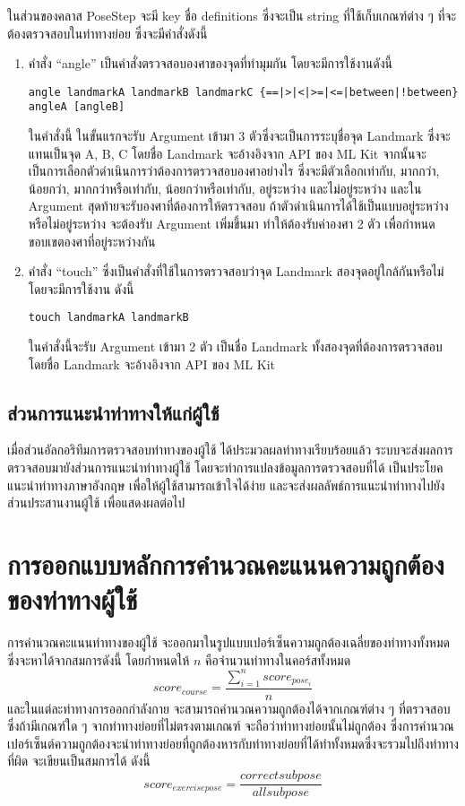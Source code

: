 ในส่วนของคลาส PoseStep จะมี key ชื่อ definitions ซึ่งจะเป็น string ที่ใช้เก็บเกณฑ์ต่าง ๆ ที่จะต้องตรวจสอบในท่าทางย่อย ซึ่งจะมีคำสั่งดังนี้

\begin{enumerate}
    \item คำสั่ง “angle” เป็นคำสั่งตรวจสอบองศาของจุดที่ทำมุมกัน โดยจะมีการใช้งานดังนี้
    \begin{lstlisting}[caption=คำสั่ง angle]
        angle landmarkA landmarkB landmarkC {==|>|<|>=|<=|between|!between} angleA [angleB]
    \end{lstlisting}
    \indent ในคำสั่งนี้ ในขั้นแรกจะรับ Argument เข้ามา 3 ตัวซึ่งจะเป็นการระบุชื่อจุด Landmark ซึ่งจะแทนเป็นจุด A, B, C โดยชื่อ Landmark จะอ้างอิงจาก API ของ ML Kit จากนั้นจะเป็นการเลือกตัวดำเนินการว่าต้องการตรวจสอบองศาอย่างไร ซึ่งจะมีตัวเลือกเท่ากับ, มากกว่า, น้อยกว่า, มากกว่าหรือเท่ากับ, น้อยกว่าหรือเท่ากับ, อยู่ระหว่าง และไม่อยู่ระหว่าง และใน Argument สุดท้ายจะรับองศาที่ต้องการให้ตรวจสอบ ถ้าตัวดำเนินการได้ใช้เป็นแบบอยู่ระหว่างหรือไม่อยู่ระหว่าง จะต้องรับ Argument เพิ่มขึ้นมา ทำให้ต้องรับค่าองศา 2 ตัว เพื่อกำหนดขอบเขตองศาที่อยู่ระหว่างกัน
    \item คำสั่ง “touch” ซึ่งเป็นคำสั่งที่ใช้ในการตรวจสอบว่าจุด Landmark สองจุดอยู่ใกล้กันหรือไม่ โดยจะมีการใช้งาน ดังนี้
    \begin{lstlisting}[caption=คำสั่ง touch]
        touch landmarkA landmarkB
    \end{lstlisting}
    ในคำสั่งนี้จะรับ Argument เข้ามา 2 ตัว เป็นชื่อ Landmark ทั้งสองจุดที่ต้องการตรวจสอบ โดยชื่อ Landmark จะอ้างอิงจาก API ของ ML Kit
\end{enumerate}

\subsection{ส่วนการแนะนำท่าทางให้แก่ผู้ใช้}
เมื่อส่วนอัลกอริทึมการตรวจสอบท่าทางของผู้ใช้ ได้ประมวลผลท่าทางเรียบร้อยแล้ว ระบบจะส่งผลการตรวจสอบมายังส่วนการแนะนำท่าทางผู้ใช้ โดยจะทำการแปลงข้อมูลการตรวจสอบที่ได้ เป็นประโยคแนะนำท่าทางภาษาอังกฤษ เพื่อให้ผู้ใช้สามารถเข้าใจได้ง่าย และจะส่งผลลัพธ์การแนะนำท่าทางไปยังส่วนประสานงานผู้ใช้ เพื่อแสดงผลต่อไป

\section{การออกแบบหลักการคำนวณคะแนนความถูกต้องของท่าทางผู้ใช้}
การคำนวณคะแนนท่าทางของผู้ใช้ จะออกมาในรูปแบบเปอร์เซ็นความถูกต้องเฉลี่ยของท่าทางทั้งหมด ซึ่งจะหาได้จากสมการดังนี้ โดยกำหนดให้ $n$ คือจำนวนท่าทางในคอร์สทั้งหมด
\begin{equation}
    score_{course} = \frac{\sum_{i=1}^{n}{score_{pose_i}}}{n}
\end{equation}
และในแต่ละท่าทางการออกกำลังกาย จะสามารถคำนวณความถูกต้องได้จากเกณฑ์ต่าง ๆ ที่ตรวจสอบ ซึ่งถ้ามีเกณฑ์ใด ๆ จากท่าทางย่อยที่ไม่ตรงตามเกณฑ์ จะถือว่าท่าทางย่อยนั้นไม่ถูกต้อง ซึ่งการคำนวณเปอร์เซ็นต์ความถูกต้องจะนำท่าทางย่อยที่ถูกต้องหารกับท่าทางย่อยที่ได้ทำทั้งหมดซึ่งจะรวมไปถึงท่าทางที่ผิด จะเขียนเป็นสมการได้ ดังนี้
\begin{equation}
    score_{exercise pose} = \frac{correct subpose}{all subpose}
\end{equation}


